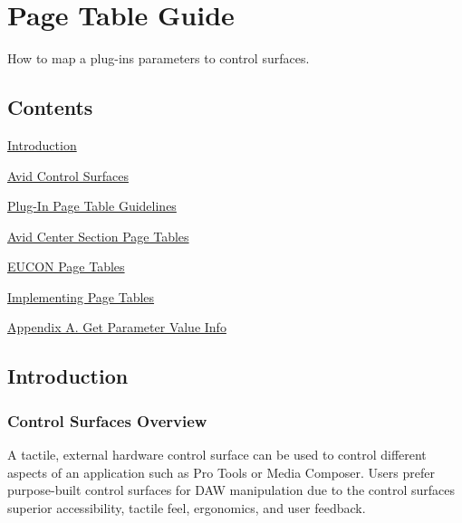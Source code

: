 \hypertarget{a00363}{}\section{Page Table Guide}
\label{a00363}
How to map a plug-\/in\textquotesingle{}s parameters to control surfaces. 

\hypertarget{a00363_aax_page_table_guide_contents}{}\subsection{Contents}\label{a00363_aax_page_table_guide_contents}
\begin{DoxyItemize}
\item \hyperlink{a00363_aax_page_table_guide_01_introduction}{Introduction} \item \hyperlink{a00363_aax_page_table_guide_02_avid_control_surfaces}{Avid Control Surfaces} \item \hyperlink{a00363_aax_page_table_guide_03_plug_in_page_table_guidelines}{Plug-\/\+In Page Table Guidelines} \item \hyperlink{a00363_aax_page_table_guide_04_avid_center_section_page_tables}{Avid Center Section Page Tables} \item \hyperlink{a00363_aax_page_table_guide__eucon_page_tables}{E\+U\+C\+O\+N Page Tables} \item \hyperlink{a00363_aax_page_table_guide_05_implementing_page_tables}{Implementing Page Tables} \item \hyperlink{a00363_aax_page_table_guide_a_get_parameter_value_info}{Appendix A. Get Parameter Value Info}\end{DoxyItemize}
 \hypertarget{a00363_aax_page_table_guide_01_introduction}{}\subsection{Introduction}\label{a00363_aax_page_table_guide_01_introduction}
 \hypertarget{a00363_subsection__control_surfaces_overview}{}\subsubsection{Control Surfaces Overview}\label{a00363_subsection__control_surfaces_overview}
A tactile, external hardware control surface can be used to control different aspects of an application such as Pro Tools or Media Composer. Users prefer purpose-\/built control surfaces for D\+A\+W manipulation due to the control surface\textquotesingle{}s superior accessibility, tactile feel, ergonomics, and user feedback.

